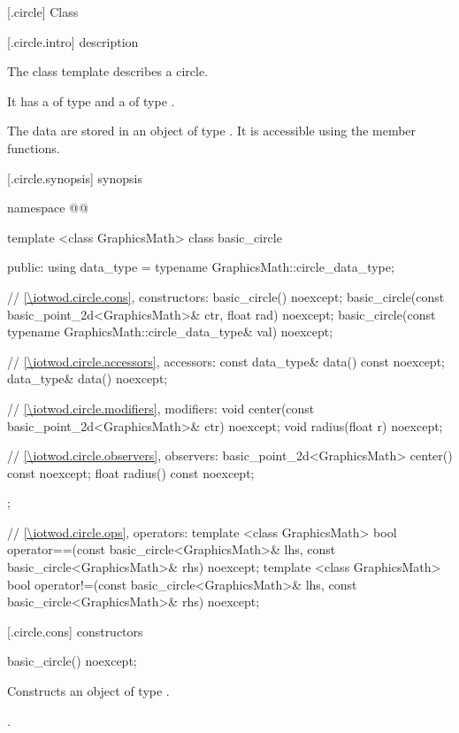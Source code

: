  [\iotwod.circle] {Class }

 [\iotwod.circle.intro] { description}

\pnum
{}%
The class template  describes a circle.

\pnum
It has a  of type  and a  of type .

\pnum
The data are stored in an object of type . It is accessible using the  member functions.

 [\iotwod.circle.synopsis] { synopsis}

\begin{codeblock}
namespace @\fullnamespace{}@ {
  template <class GraphicsMath>
  class basic_circle {
  public:
    using data_type = typename GraphicsMath::circle_data_type;
    
    // \ref{\iotwod.circle.cons}, constructors:
    basic_circle() noexcept;
    basic_circle(const basic_point_2d<GraphicsMath>& ctr, float rad) noexcept;
    basic_circle(const typename GraphicsMath::circle_data_type& val) noexcept;

    // \ref{\iotwod.circle.accessors}, accessors:
    const data_type& data() const noexcept;
    data_type& data() noexcept;

    // \ref{\iotwod.circle.modifiers}, modifiers:
    void center(const basic_point_2d<GraphicsMath>& ctr) noexcept;
    void radius(float r) noexcept;

    // \ref{\iotwod.circle.observers}, observers:
    basic_point_2d<GraphicsMath> center() const noexcept;
    float radius() const noexcept;
  };

  // \ref{\iotwod.circle.ops}, operators:
  template <class GraphicsMath>
  bool operator==(const basic_circle<GraphicsMath>& lhs,
    const basic_circle<GraphicsMath>& rhs) noexcept;
  template <class GraphicsMath>
  bool operator!=(const basic_circle<GraphicsMath>& lhs,
    const basic_circle<GraphicsMath>& rhs) noexcept;
}
\end{codeblock}

 [\iotwod.circle.cons] { constructors}

%
\begin{itemdecl}
basic_circle() noexcept;
\end{itemdecl}
\begin{itemdescr}
\pnum
\effects
Constructs an object of type .

\pnum
\postconditions
{}.
\end{itemdescr}

